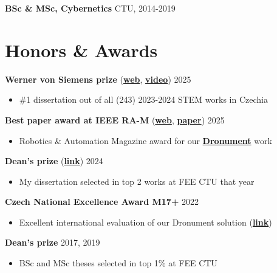 \documentclass[12pt,a4paper]{article}
\newcommand\Colorhreff[3][reff]{\href{#2}{\color{#1}#3}}
\begin{document}
\begin{paracol}{2}
\vspace{0.2cm}
\noindent
\textbf{BSc \& MSc, Cybernetics} \hfill CTU, 2014-2019

\section*{Honors \& Awards}
\textbf{Werner von Siemens prize} (\Colorhreff{https://www.cenasiemens.cz/minule-rocniky/vitezove-2024/\#disertacni-prace}{\textbf{web}}, \Colorhreff{https://www.youtube.com/watch?v=idnDA4Ap-J4}{\textbf{video}}) \hfill 2025
\begin{itemize}
  \item \#1 dissertation out of all (243) 2023-2024 STEM works in Czechia
\end{itemize}

\vspace{0.2cm}
\noindent
\textbf{Best paper award at IEEE RA-M} (\Colorhreff{https://www.linkedin.com/posts/mrsgroupprague_icra2025-robotics-dronetechnology-activity-7332784284316962816-kg45}{\textbf{web}}, \Colorhreff{https://mrs.fel.cvut.cz/data/papers/petracek2023ram.pdf}{\textbf{paper}}) \hfill 2025
\begin{itemize}
  \item Robotics \& Automation Magazine award for our \Colorhreff{https://www.youtube.com/watch?v=Gx-mBklSbYc}{\textbf{Dronument}} work
\end{itemize}

\vspace{0.2cm}
\noindent
\textbf{Dean's prize} (\Colorhreff{https://cyber.felk.cvut.cz/news/pavel-petracek-received-the-deans-award-for-prestigious-dissertation/}{\textbf{link}}) \hfill 2024
\begin{itemize}
  \item My dissertation selected in top 2 works at FEE CTU that year
\end{itemize}

\vspace{0.2cm}
\noindent
\textbf{Czech National Excellence Award M17+} \hfill 2022
\begin{itemize}
  \item Excellent international evaluation of our Dronument solution (\Colorhreff{https://mrs.fel.cvut.cz/dg18p02ovv069-fvz}{\textbf{link}})
\end{itemize}

\vspace{0.2cm}
\noindent
\textbf{Dean's prize} \hfill 2017, 2019
\begin{itemize}
  \item BSc and MSc theses selected in top 1\% at FEE CTU
\end{itemize}

\end{paracol}
\end{document}
